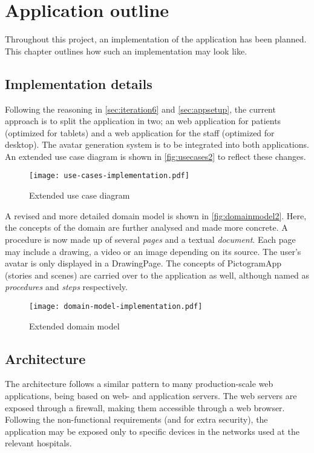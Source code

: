 \chapter{Application outline}
\label{ch:outline}

Throughout this project, an implementation of the application has been planned. This chapter outlines how such an implementation may look like.

\section{Implementation details}

Following the reasoning in \autoref{sec:iteration6} and \autoref{sec:appsetup}, the current approach is to split the application in two; an web application for patients (optimized for tablets) and a web application for the staff (optimized for desktop). The avatar generation system is to be integrated into both applications. An extended use case diagram is shown in \autoref{fig:usecases2} to reflect these changes.

\begin{figure}
    \centering
    \texttt{[image: use-cases-implementation.pdf]}
    \caption{Extended use case diagram}
    \label{fig:usecases2}
\end{figure}

A revised and more detailed domain model is shown in \autoref{fig:domainmodel2}. Here, the concepts of the domain are further analysed and made more concrete. A procedure is now made up of several \emph{pages} and a textual \emph{document}. Each page may include a drawing, a video or an image depending on its source. The user's avatar is only displayed in a DrawingPage. The concepts of PictogramApp (stories and scenes) are carried over to the application as well, although named as \emph{procedures} and \emph{steps} respectively.

\begin{figure}
    \centering
    \texttt{[image: domain-model-implementation.pdf]}
    \caption{Extended domain model}
    \label{fig:domainmodel2}
\end{figure}

\section{Architecture}

The architecture follows a similar pattern to many production-scale web applications, being based on web- and application servers. The web servers are exposed through a firewall, making them accessible through a web browser. Following the non-functional requirements (and for extra security), the application may be exposed only to specific devices in the networks used at the relevant hospitals.

